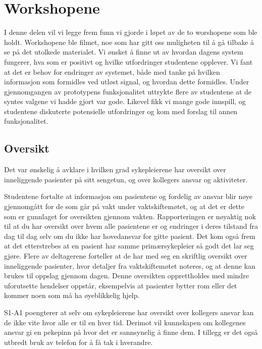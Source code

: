 \section{Workshopene}
\label{ws}

I denne delen vil vi legge frem funn vi gjorde i løpet av de to worshopene som ble holdt. Workshopene ble filmet, noe som har gitt oss muligheten til å gå tilbake å se på det utolkede materialet. Vi ønsket å finne ut av hvordan dagens system fungerer, hva som er positivt og hvilke utfordringer studentene opplever. Vi fant at det er behov for endringer av systemet, både med tanke på hvilken informasjon som formidles ved utløst signal, og hvordan dette formidles. Under gjennomgangen av prototypens funksjonalitet uttrykte flere av studentene at de syntes valgene vi hadde gjort var gode. Likevel fikk vi mange gode innspill, og studentene diskuterte potensielle utfordringer og kom med forslag til annen funksjonalitet. 


\subsection{Oversikt}
Det var ønskelig å avklare i hvilken grad sykepleierene har oversikt over inneliggende pasienter på sitt sengetun, og over kollegers ansvar og aktiviteter.

\noindent
Studentene fortalte at informasjon om pasientene og fordelig av ansvar blir nøye gjennomgått for de som går på vakt under vaktskiftemøtet, og at det er dette som er gunnlaget for oversikten gjennom vakten. Rapporteringen er nøyaktig nok til at du har oversikt over hvem alle pasientene er og endringer i deres tilstand fra dag til dag selv om du ikke har hovedansvar for gitte pasient. Det kom også frem at det etterstrebes at en pasient har samme primærsykepleier så godt det lar seg gjøre. Flere av deltagerene forteller at de har med seg en skriftlig oversikt over inneliggende pasienter, hvor detaljer fra vaktskiftemøtet noteres, og at denne kan brukes til oppslag gjennom dagen. Denne oversikten opprettholdes med mindre uforutsette hendelser oppstår, eksempelvis at pasienter bytter rom eller det kommer noen som må ha øyeblikkelig hjelp. 

\noindent
S1-A1 poengterer at selv om sykepleierene har oversikt over kollegers ansvar kan de ikke vite hvor alle er til en hver tid. Derimot vil kunnskapen om kollegenes ansvar gi en pekepinn på hvor det er sannsynelig å finne dem. I tillegg er det også utbredt bruk av telefon for å få tak i hverandre. 

